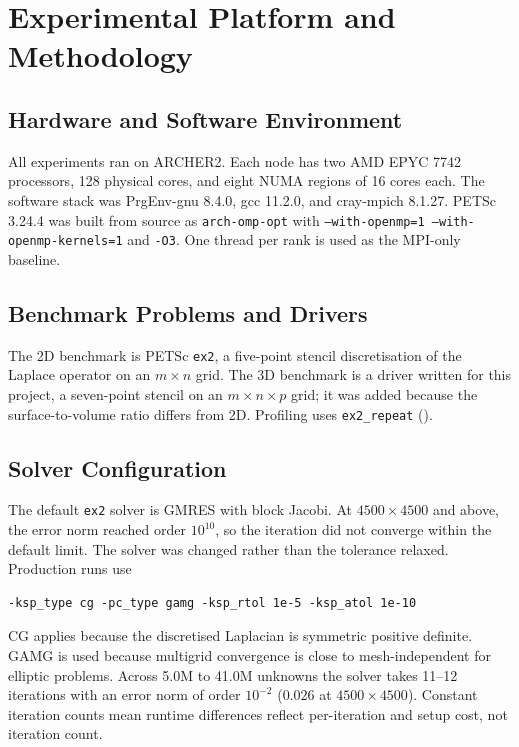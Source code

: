 \chapter{Experimental Platform and Methodology}
\label{ch:methodology}

\section{Hardware and Software Environment}
\label{sec:env}
All experiments ran on ARCHER2. Each node has two AMD EPYC 7742 processors, 128 physical
cores, and eight NUMA regions of 16 cores each. The software stack was PrgEnv-gnu 8.4.0,
gcc 11.2.0, and cray-mpich 8.1.27. PETSc 3.24.4 was built from source as
\texttt{arch-omp-opt} with \texttt{--with-openmp=1 --with-openmp-kernels=1} and
\texttt{-O3}. One thread per rank is used as the MPI-only baseline.

\section{Benchmark Problems and Drivers}
\label{sec:benchmarks}
The 2D benchmark is PETSc \texttt{ex2}, a five-point stencil discretisation of the Laplace
operator on an $m \times n$ grid. The 3D benchmark is a driver written for this project, a
seven-point stencil on an $m \times n \times p$ grid; it was added because the
surface-to-volume ratio differs from 2D. Profiling uses \texttt{ex2\_repeat}
().

\section{Solver Configuration}
\label{sec:solver}
The default \texttt{ex2} solver is GMRES with block Jacobi. At $4500 \times 4500$ and
above, the error norm reached order $10^{10}$, so the iteration did not converge within
the default limit. The solver was changed rather than the tolerance relaxed. Production
runs use
\begin{verbatim}
-ksp_type cg -pc_type gamg -ksp_rtol 1e-5 -ksp_atol 1e-10
\end{verbatim}
CG applies because the discretised Laplacian is symmetric positive definite. GAMG is used
because multigrid convergence is close to mesh-independent for elliptic problems. Across
5.0M to 41.0M unknowns the solver takes 11--12 iterations with an error norm of order
$10^{-2}$ ($0.026$ at $4500 \times 4500$). Constant iteration counts mean runtime
differences reflect per-iteration and setup cost, not iteration count.

